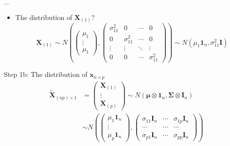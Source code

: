 \documentclass[
  ignorenonframetext,
]{beamer}
\providecommand{\tightlist}{%
  \setlength{\itemsep}{0pt}\setlength{\parskip}{0pt}}
\begin{document}
\begin{frame}{\_}
\protect\hypertarget{section}{}
\begin{itemize}
\tightlist
\item
  The distribution of \(\mathbf X_{(1)}\)? \[
  \mathbf X_{(1)} \sim N(
  \begin{pmatrix}
  \mu_1 \\ \vdots \\ \mu_1
  \end{pmatrix},
  \begin{pmatrix}
  \sigma_{11}^2 &  0 & \cdots& 0\\
  0 & \sigma_{11}^2 & \cdots & 0\\
  \vdots & \vdots & \ddots & \vdots\\
  0 & 0 & \cdots & \sigma_{11}^2
  \end{pmatrix}
  )\sim N(\mu_1 \mathbf 1_n, \sigma_{11}^2 \mathbf I)
  \]
\end{itemize}
\end{frame}

\begin{frame}{Step 1b: The distribution of \(\mathbf x_{n\times p}\)}
\protect\hypertarget{step-1b-the-distribution-of-mathbf-x_ntimes-p}{}
\[
\begin{aligned}
\tilde {\mathbf X}_{(np)\times 1} &=
\begin{pmatrix}
\mathbf X_{(1)}\\ \vdots \\ \mathbf X_{(p)} \end{pmatrix}
\sim N(\boldsymbol \mu \otimes\mathbf 1_n, 
\boldsymbol \Sigma \otimes \mathbf I_n)\\
&\sim 
N (
\begin{pmatrix}\mu_1 \mathbf 1_n \\ \vdots \\\mu_p \mathbf 1_n\end{pmatrix},  
\begin{pmatrix}
\sigma_{11}\mathbf I_n & \cdots & \sigma_{1p}\mathbf I_n\\
\cdots & \cdots & \cdots \\
\sigma_{p1}\mathbf I_n & \cdots & \sigma_{pp}\mathbf I_n
\end{pmatrix})
\end{aligned}
\]
\end{frame}
\end{document}
